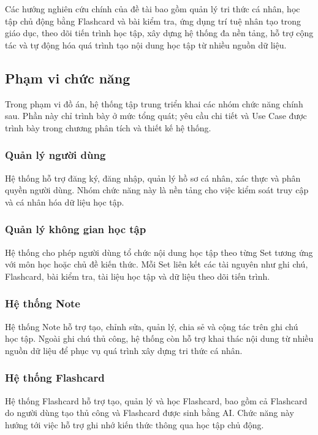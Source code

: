 Các hướng nghiên cứu chính của đề tài bao gồm quản lý tri thức cá nhân, học tập chủ động bằng Flashcard và bài kiểm tra, ứng dụng trí tuệ nhân tạo trong giáo dục, theo dõi tiến trình học tập, xây dựng hệ thống đa nền tảng, hỗ trợ cộng tác và tự động hóa quá trình tạo nội dung học tập từ nhiều nguồn dữ liệu.

\subsection{Phạm vi chức năng}

Trong phạm vi đồ án, hệ thống tập trung triển khai các nhóm chức năng chính sau. Phần này chỉ trình bày ở mức tổng quát; yêu cầu chi tiết và Use Case được trình bày trong chương phân tích và thiết kế hệ thống.

\subsubsection{Quản lý người dùng}

Hệ thống hỗ trợ đăng ký, đăng nhập, quản lý hồ sơ cá nhân, xác thực và phân quyền người dùng. Nhóm chức năng này là nền tảng cho việc kiểm soát truy cập và cá nhân hóa dữ liệu học tập.

\subsubsection{Quản lý không gian học tập}

Hệ thống cho phép người dùng tổ chức nội dung học tập theo từng Set tương ứng với môn học hoặc chủ đề kiến thức. Mỗi Set liên kết các tài nguyên như ghi chú, Flashcard, bài kiểm tra, tài liệu học tập và dữ liệu theo dõi tiến trình.

\subsubsection{Hệ thống Note}

Hệ thống Note hỗ trợ tạo, chỉnh sửa, quản lý, chia sẻ và cộng tác trên ghi chú học tập. Ngoài ghi chú thủ công, hệ thống còn hỗ trợ khai thác nội dung từ nhiều nguồn dữ liệu để phục vụ quá trình xây dựng tri thức cá nhân.

\subsubsection{Hệ thống Flashcard}

Hệ thống Flashcard hỗ trợ tạo, quản lý và học Flashcard, bao gồm cả Flashcard do người dùng tạo thủ công và Flashcard được sinh bằng AI. Chức năng này hướng tới việc hỗ trợ ghi nhớ kiến thức thông qua học tập chủ động.

